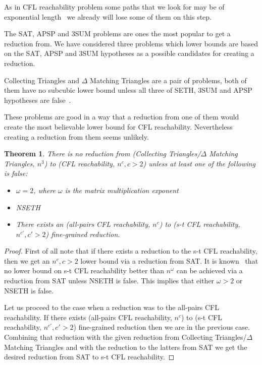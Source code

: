 \documentclass[12pt]{article}
\newtheorem{theorem}{Theorem}[section]
\begin{document}
As in CFL reachability problem some paths that we look for may be of exponential length~\cite{PIERRE1992279} we already will lose some of them on this step. 
\fi

The SAT, APSP and 3SUM problems are ones the most popular to get a reduction from. We have considered three problems which lower bounds are based on the SAT, APSP and 3SUM hypotheses as a possible candidates for creating a reduction.

Collecting Triangles and $\Delta$ Matching Triangles are a pair of problems, both of them have no subcubic lower bound unless all three of SETH, 3SUM and APSP hypotheses are false~\cite{10.1145/2746539.2746594}.

These problems are good in a way that a reduction from one of them would create the most believable lower bound for CFL reachability. Nevertheless creating a reduction from them seems unlikely.

\begin{theorem}
There is no reduction from (Collecting Triangles/$\Delta$ Matching Triangles, $n^3$) to (CFL reachability, $n^c, c > 2$) unless at least one of the following is false:

\begin{itemize}
    \item $\omega = 2$, where $\omega$ is the matrix multiplication exponent
    \item NSETH
    \item There exists an (all-pairs CFL reachability, $n^{c}$) to (s-t CFL reachability, $n^{c'}, c' > 2$) fine-grained reduction.
\end{itemize}
\end{theorem}

\begin{proof}
First of all note that if there exists a reduction to the s-t CFL reachability, then we get an $n^c, c>2$ lower bound via a reduction from SAT. It is known~\cite{10.1145/3498702} that no lower bound on s-t CFL reachability better than $n^{\omega}$ can be achieved via a reduction from SAT unless NSETH is false. This implies that either $\omega > 2$ or NSETH is false.

Let us proceed to the case when a reduction was to the all-pairs CFL reachability. If there exists (all-pairs CFL reachability, $n^{c}$) to (s-t CFL reachability, $n^{c'}, c' > 2$) fine-grained reduction then we are in the previous case. Combining that reduction with the given reduction from Collecting Triangles/$\Delta$ Matching Triangles and with the reduction to the latters from SAT we get the desired reduction from SAT to s-t CFL reachability.
\end{proof}
\end{document}
